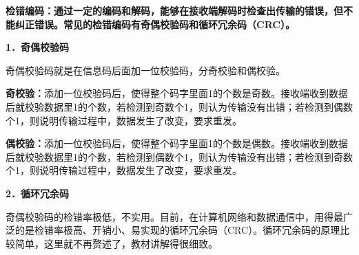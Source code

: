 {\textbf{检错编码：通过一定的编码和解码，能够在接收端解码时检查出传输的错误，但不能纠正错误。常见的检错编码有奇偶校验码和循环冗余码（CRC）。}}

\textbf{1．奇偶校验码}

奇偶校验码就是在信息码后面加一位校验码，分奇校验和偶校验。

\textbf{奇校验：}添加一位校验码后，使得整个码字里面1的个数是奇数。接收端收到数据后就校验数据里1的个数，若检测到奇数个1，则认为传输没有出错；若检测到偶数个1，则说明传输过程中，数据发生了改变，要求重发。

\textbf{偶校验：}添加一位校验码后，使得整个码字里面1的个数是偶数。接收端收到数据后就校验数据里1的个数，若检测到偶数个1，则认为传输没有出错；若检测到奇数个1，则说明传输过程中，数据发生了改变，要求重发。

\textbf{2．循环冗余码}

奇偶校验码的检错率极低，不实用。目前，在计算机网络和数据通信中，用得最广泛的是检错率极高、开销小、易实现的循环冗余码（CRC）。循环冗余码的原理比较简单，这里就不再赘述了，教材讲解得很细致。
